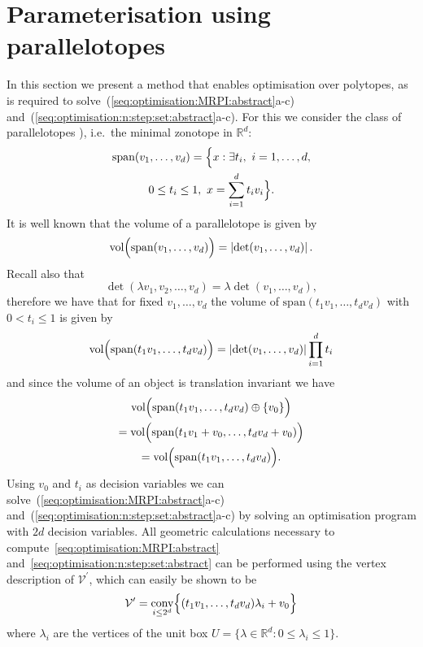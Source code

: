 \documentclass{ifacconf}
\providecommand{\abs}[1]{\left|#1\right|}
\providecommand{\conv}{\text{conv}}
\providecommand{\vol}{\text{vol}}
\providecommand{\spann}{\text{span}}
\providecommand{\V}{\mathcal V}
\providecommand{\RR}{\mathbb R}
\begin{document}
\section{Parameterisation using  parallelotopes}\label{sec:volume:of:hypercube}
%
%
In this section we present a method that enables optimisation over polytopes, as is required to solve~(\ref{seq:optimisation:MRPI:abstract}a-c) and~(\ref{seq:optimisation:n:step:set:abstract}a-c).
%
For this we consider the class of parallelotopes \citep[see
e.g.][]{Coxeter:1973}), i.e.~the minimal zonotope in $\RR^d$: 
\begin{multline*}
  \spann(v_1,\dots,v_d) = \Bigl\{x:\exists t_i, \ 
i = 1,\ldots, d, \\
0 \leq t_i\leq1, \ 
 x = \sum_{i=1}^dt_iv_i\Bigr\}.
\end{multline*}
%
It is well known that the volume of a parallelotope is given by
%
\begin{equation}
	\vol\Bigl(\spann(v_1,\dots,v_d)\Bigr) = \abs{\det(v_1,\dots,v_d)}.
\end{equation}
%
Recall also that 
\[
\det(\lambda v_1,v_2,\dots,v_d) = \lambda\det(v_1,\dots,v_d),
\]
therefore we have that for fixed $v_1,\dots,v_d$ the volume of $\spann(t_1v_1,\dots,t_dv_d)$ with $0<t_i\leq1$ is given by
%
\begin{equation}
	\vol\Bigl(\spann(t_1v_1,\dots,t_dv_d)\Bigr) = \abs{\det(v_1,\dots,v_d)}\prod_{i=1}^d t_i
\end{equation}
%
and since the volume of an object is translation invariant we have 
\begin{multline*}
\vol\Bigl(\spann(t_1v_1,\dots,t_dv_d)\oplus\{v_0\}\Bigr) \\
= \vol\Bigl(\spann(t_1v_1+v_0,\dots,t_dv_d+v_0)\Bigr) \\
= \vol\Bigl(\spann(t_1v_1,\dots,t_dv_d)\Bigr).
\end{multline*}
Using $v_0$ and $t_i$ as decision variables we can solve~(\ref{seq:optimisation:MRPI:abstract}a-c) and~(\ref{seq:optimisation:n:step:set:abstract}a-c) by solving an optimisation program with $2d$ decision variables.
%
All geometric calculations necessary to compute~\eqref{seq:optimisation:MRPI:abstract} and~\eqref{seq:optimisation:n:step:set:abstract} can be performed using the vertex description of $\V^\prime$, which can easily be shown to be
%
\begin{equation}
	\V^\prime = \underset{i\leq 2^d}{\conv}\Bigl\{(t_1v_1,\dots,t_dv_d)\lambda_i+v_0\Bigr\}
\end{equation}
%
where $\lambda_i$ are the vertices of the unit box $U = \{\lambda\in\RR^d:0\leq\lambda_i\leq 1\}$.
\end{document}
